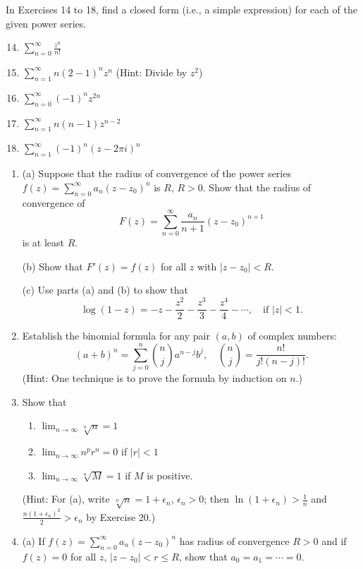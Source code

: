 \documentclass[12pt]{article}
\theoremstyle{definition} %
\theoremstyle{plain} %
\begin{document}
In Exercises 14 to 18, find a closed form (i.e., a simple expression) for each of the given power series.
\begin{enumerate}
    \setcounter{enumi}{13}
    \item $\sum_{n=0}^\infty \frac{z^n}{n!}$
    \item $\sum_{n=1}^\infty n(2 - 1)^n z^n$ \hfill (Hint: Divide by $z^2$)
    \item $\sum_{n=0}^\infty (-1)^n z^{2n}$
    \item $\sum_{n=1}^\infty n(n - 1) z^{n - 2}$
    \item $\sum_{n=1}^\infty (-1)^n (z - 2\pi i)^n$
\end{enumerate}
\noindent
\begin{enumerate}
    \item (a) Suppose that the radius of convergence of the power series $f(z) = \sum_{n=0}^\infty a_n (z - z_0)^n$ is $R$, $R > 0$. Show that the radius of convergence of 
    \[
    F(z) = \sum_{n=0}^\infty \frac{a_n}{n+1} (z - z_0)^{n+1}
    \]
    is at least $R$.
    
    (b) Show that $F'(z) = f(z)$ for all $z$ with $|z - z_0| < R$.
    
    (c) Use parts (a) and (b) to show that 
    \[
    \log(1 - z) = -z - \frac{z^2}{2} - \frac{z^3}{3} - \frac{z^4}{4} - \cdots, \quad \text{if } |z| < 1.
    \]
    
    \item Establish the binomial formula for any pair $(a, b)$ of complex numbers:
    \[
    (a + b)^n = \sum_{j=0}^n \binom{n}{j} a^{n - j} b^j, \quad \binom{n}{j} = \frac{n!}{j!(n-j)!}.
    \]
    (Hint: One technique is to prove the formula by induction on $n$.)
    
    \item Show that
    \begin{enumerate}
        \item $\lim_{n \to \infty} \sqrt[n]{n} = 1$
        \item $\lim_{n \to \infty} n^p r^n = 0$ if $|r| < 1$
        \item $\lim_{n \to \infty} \sqrt[n]{M} = 1$ if $M$ is positive.
    \end{enumerate}
    (Hint: For (a), write $\sqrt[n]{n} = 1 + \epsilon_n$, $\epsilon_n > 0$; then $\ln(1 + \epsilon_n) > \frac{1}{n}$ and $\frac{n(1 + \epsilon_n)^2}{2} > \epsilon_n$ by Exercise 20.)
    
    \item (a) If $f(z) = \sum_{n=0}^\infty a_n (z - z_0)^n$ has radius of convergence $R > 0$ and if $f(z) = 0$ for all $z$, $|z - z_0| < r \leq R$, show that $a_0 = a_1 = \cdots = 0$.
    

\end{enumerate}
\end{document}
